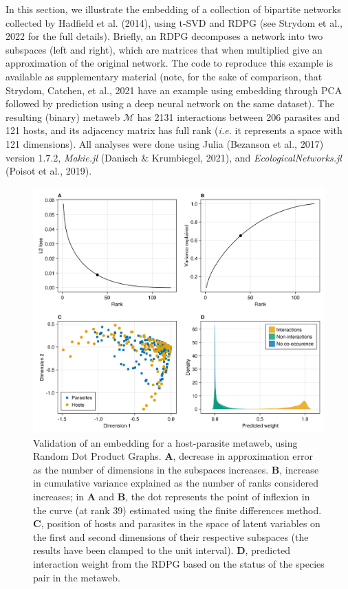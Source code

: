 \documentclass[11pt]{article}
\makeatletter
\def\maxwidth{\ifdim\Gin@nat@width>\linewidth\linewidth
\else\Gin@nat@width\fi}
\let\Oldincludegraphics\includegraphics
\renewcommand{\includegraphics}[1]{\Oldincludegraphics[width=\maxwidth]{#1}}
\makeatother
\begin{document}
In this section, we illustrate the embedding of a collection of
bipartite networks collected by Hadfield et al. (2014), using t-SVD and
RDPG (see Strydom et al., 2022 for the full details). Briefly, an RDPG
decomposes a network into two subspaces (left and right), which are
matrices that when multiplied give an approximation of the original
network. The code to reproduce this example is available as
supplementary material (note, for the sake of comparison, that Strydom,
Catchen, et al., 2021 have an example using embedding through PCA
followed by prediction using a deep neural network on the same dataset).
The resulting (binary) metaweb \(\mathcal{M}\) has 2131 interactions
between 206 parasites and 121 hosts, and its adjacency matrix has full
rank (\emph{i.e.} it represents a space with 121 dimensions). All
analyses were done using Julia (Bezanson et al., 2017) version 1.7.2,
\emph{Makie.jl} (Danisch \& Krumbiegel, 2021), and
\emph{EcologicalNetworks.jl} (Poisot et al., 2019).

\begin{figure}
\hypertarget{fig:illustration1}{%
\centering
\includegraphics{figures/illustration-part1.png}
\caption{Validation of an embedding for a host-parasite metaweb, using
Random Dot Product Graphs. \textbf{A}, decrease in approximation error
as the number of dimensions in the subspaces increases. \textbf{B},
increase in cumulative variance explained as the number of ranks
considered increases; in \textbf{A} and \textbf{B}, the dot represents
the point of inflexion in the curve (at rank 39) estimated using the
finite differences method. \textbf{C}, position of hosts and parasites
in the space of latent variables on the first and second dimensions of
their respective subspaces (the results have been clamped to the unit
interval). \textbf{D}, predicted interaction weight from the RDPG based
on the status of the species pair in the
metaweb.}\label{fig:illustration1}
}
\end{figure}
\end{document}
